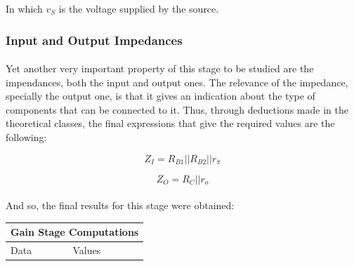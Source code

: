 In which $v_S$ is the voltage supplied by the source. 



\subsubsection{Input and Output Impedances}

\paragraph{}Yet another very important property of this stage to be studied are the impendances, both the input and output ones. The relevance of the impedance, specially the output one, is that it gives an indication about the type of components that can be connected to it. Thus, through deductions made in the theoretical classes, the final expressions that give the required values are the following:




\begin{equation}
    Z_I=R_{B1}||R_{B2}||r_\pi
\end{equation}

\begin{equation}
    Z_O=R_C||r_o
\end{equation}


\paragraph{}And so, the final results for this stage were obtained:

\begin{table}[H]
\centering
\begin{tabular}{|l|l|} 
\hline
\multicolumn{2}{|l|}{\textbf{Gain Stage Computations}}  \\ 
\hline
Data             & Values                               \\ 
\hline
        
\end{tabular}
\end{table}

